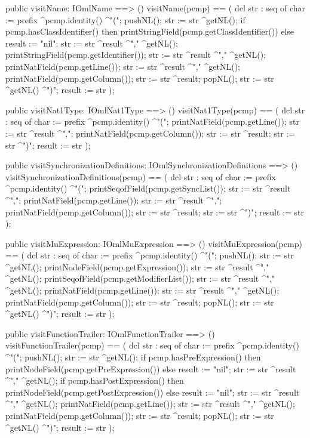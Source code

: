 \begin{vdm_al}
  public visitName: IOmlName ==> ()
  visitName(pcmp) ==
    ( dcl str : seq of char := prefix ^pcmp.identity() ^"(";
      pushNL();
      str := str ^getNL();
      if pcmp.hasClassIdentifier()
      then printStringField(pcmp.getClassIdentifier())
      else result := "nil";
      str := str ^result ^"," ^getNL();
      printStringField(pcmp.getIdentifier());
      str := str ^result ^"," ^getNL();
      printNatField(pcmp.getLine());
      str := str ^result ^"," ^getNL();
      printNatField(pcmp.getColumn());
      str := str ^result;
      popNL();
      str := str ^getNL() ^")";
      result := str );

  public visitNat1Type: IOmlNat1Type ==> ()
  visitNat1Type(pcmp) ==
    ( dcl str : seq of char := prefix ^pcmp.identity() ^"(";
      printNatField(pcmp.getLine());
      str := str ^result ^",";
      printNatField(pcmp.getColumn());
      str := str ^result;
      str := str ^")";
      result := str );

  public visitSynchronizationDefinitions: IOmlSynchronizationDefinitions ==> ()
  visitSynchronizationDefinitions(pcmp) ==
    ( dcl str : seq of char := prefix ^pcmp.identity() ^"(";
      printSeqofField(pcmp.getSyncList());
      str := str ^result ^",";
      printNatField(pcmp.getLine());
      str := str ^result ^",";
      printNatField(pcmp.getColumn());
      str := str ^result;
      str := str ^")";
      result := str );

  public visitMuExpression: IOmlMuExpression ==> ()
  visitMuExpression(pcmp) ==
    ( dcl str : seq of char := prefix ^pcmp.identity() ^"(";
      pushNL();
      str := str ^getNL();
      printNodeField(pcmp.getExpression());
      str := str ^result ^"," ^getNL();
      printSeqofField(pcmp.getModifierList());
      str := str ^result ^"," ^getNL();
      printNatField(pcmp.getLine());
      str := str ^result ^"," ^getNL();
      printNatField(pcmp.getColumn());
      str := str ^result;
      popNL();
      str := str ^getNL() ^")";
      result := str );

  public visitFunctionTrailer: IOmlFunctionTrailer ==> ()
  visitFunctionTrailer(pcmp) ==
    ( dcl str : seq of char := prefix ^pcmp.identity() ^"(";
      pushNL();
      str := str ^getNL();
      if pcmp.hasPreExpression()
      then printNodeField(pcmp.getPreExpression())
      else result := "nil";
      str := str ^result ^"," ^getNL();
      if pcmp.hasPostExpression()
      then printNodeField(pcmp.getPostExpression())
      else result := "nil";
      str := str ^result ^"," ^getNL();
      printNatField(pcmp.getLine());
      str := str ^result ^"," ^getNL();
      printNatField(pcmp.getColumn());
      str := str ^result;
      popNL();
      str := str ^getNL() ^")";
      result := str );


\end{vdm_al}
